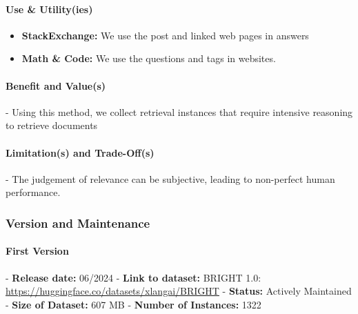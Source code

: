 \paragraph{Use \& Utility(ies)}
\begin{itemize}
\item \textbf{StackExchange:} We use the post and linked web pages in answers
\item \textbf{Math \& Code:} We use the questions and tags in websites.
\end{itemize}

\paragraph{Benefit and Value(s)}
- Using this method, we collect retrieval instances that require intensive reasoning to retrieve documents

\paragraph{Limitation(s) and Trade-Off(s)}
- The judgement of relevance can be subjective, leading to non-perfect human performance.

\subsubsection{Version and Maintenance}
\paragraph{First Version}
- \textbf{Release date:} 06/2024
- \textbf{Link to dataset:} BRIGHT 1.0: \url{https://huggingface.co/datasets/xlangai/BRIGHT}
- \textbf{Status:} Actively Maintained
- \textbf{Size of Dataset:} 607 MB
- \textbf{Number of Instances:} 1322

